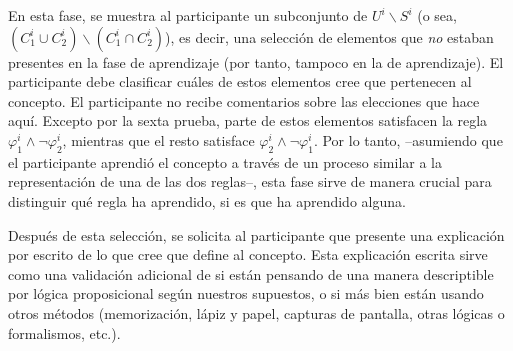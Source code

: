 En esta fase, se muestra al participante un subconjunto de $U^i \backslash S^i $ (o sea, $(C^i_1 \cup C^i_2) \backslash (C^i_1 \cap C^i_2) $), es decir, una selección de elementos que \emph {no} estaban presentes en la fase de aprendizaje (por tanto, tampoco en la de aprendizaje). El participante debe clasificar cuáles de estos elementos cree que pertenecen al concepto. El participante no recibe comentarios sobre las elecciones que hace aquí. Excepto por la sexta prueba, parte de estos elementos satisfacen la regla $\varphi^i_1 \land \lnot \varphi^i_2$, mientras que el resto satisface $\varphi^i_2 \land \lnot \varphi^i_1$. Por lo tanto, --asumiendo que el participante aprendió el concepto a través de un proceso similar a la representación de una de las dos reglas--, esta fase sirve de manera crucial para distinguir qué regla ha aprendido, si es que ha aprendido alguna.

Después de esta selección, se solicita al participante que presente una explicación por escrito de lo que cree que define al concepto. Esta explicación escrita sirve como una validación adicional de si están pensando de una manera descriptible por lógica proposicional según nuestros supuestos, o si más bien están usando otros métodos (memorización, lápiz y papel, capturas de pantalla, otras lógicas o formalismos, etc.).

